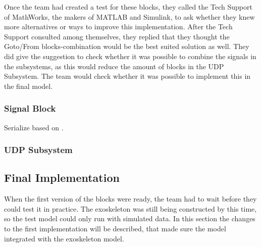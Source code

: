 Once the team had created a test for these blocks, they called the Tech Support of MathWorks, the makers of MATLAB and Simulink, to ask whether they knew more alternatives or ways to improve this implementation. After the Tech Support consulted among themselves, they replied that they thought the Goto/From blocks-combination would be the best suited solution as well. They did give the suggestion to check whether it was possible to combine the signals in the subsystems, as this would reduce the amount of blocks in the UDP Subsystem. The team would check whether it was possible to implement this in the final model.

\subsubsection{Signal Block}
Serialize based on \cite{web:serialize}.
\subsubsection{UDP Subsystem}


\subsection{Final Implementation}\label{sec:simfinim}
When the first version of the blocks were ready, the team had to wait before they could test it in practice. The exoskeleton was still being constructed by this time, so the test model could only run with simulated data. In this section the changes to the first implementation will be described, that made sure the model integrated with the exoskeleton model.



